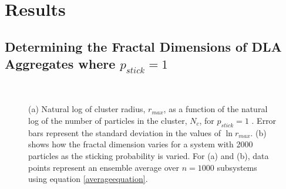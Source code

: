 \documentclass[11pt]{iopart}
\begin{document}
\section{Results}

\subsection{Determining the Fractal Dimensions of DLA Aggregates where $p_{stick} = 1$}

\begin{figure}[t]
    \centering
     \\
 
    \caption{(a) Natural log of cluster radius, $r_{max}$, as a function of the natural log of the number of particles in the cluster, $N_c$, for $p_{stick} = 1$ . Error bars represent the standard deviation in the values of $\ln r_{max}$. (b) shows how the fractal dimension varies for a system with 2000 particles as the sticking probability is varied. For (a) and (b), data points represent an ensemble average over $n=1000$ subsystems using equation \ref{averageequation}.}
        \label{fig:loggraph}
        \label{fig:stickinggraph}
\end{figure}
\end{document}
